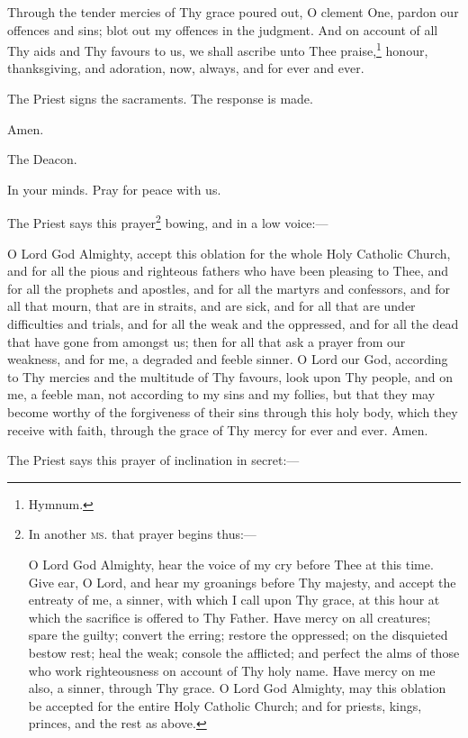 Through the tender mercies of Thy grace poured out, O clement One, pardon our offences and sins; blot out my offences in the judgment. And on account of all Thy aids and Thy favours to us, we shall ascribe unto Thee praise,\footnote{\par  Hymnum.} honour, thanksgiving, and adoration, now, always, and for ever and ever.

The Priest signs the sacraments. The response is made.

Amen.

The Deacon.

In your minds. Pray for peace with us.

The Priest says this prayer\footnote{\par  In another \textsc{ms}. that prayer begins thus:—  \par O Lord God Almighty, hear the voice of my cry before Thee at this time. Give ear, O Lord, and hear my groanings before Thy majesty, and accept the entreaty of me, a sinner, with which I call upon Thy grace, at this hour at which the sacrifice is offered to Thy Father. Have mercy on all creatures; spare the guilty; convert the erring; restore the oppressed; on the disquieted bestow rest; heal the weak; console the afflicted; and perfect the alms of those who work righteousness on account of Thy holy name. Have mercy on me also, a sinner, through Thy grace. O Lord God Almighty, may this oblation be accepted for the entire Holy Catholic Church; and for priests, kings, princes, and the rest as above.} bowing, and in a low voice:—

O Lord God Almighty, accept this oblation for the whole Holy Catholic Church, and for all the pious and righteous fathers who have been pleasing to Thee, and for all the prophets and apostles, and for all the martyrs and confessors, and for all that mourn, that are in straits, and are sick, and for all that are under difficulties and trials, and for all the weak and the oppressed, and for all the dead that have gone from amongst us; then for all that ask a prayer from our weakness, and for me, a degraded and feeble sinner. O Lord our God, according to Thy mercies and the multitude of Thy favours, look upon Thy people, and on me, a feeble man, not according to my sins and my follies, but that they may become worthy of the forgiveness of their sins through this holy body, which they receive with faith, through the grace of Thy mercy for ever and ever. Amen.

The Priest says this prayer of inclination in secret:—

